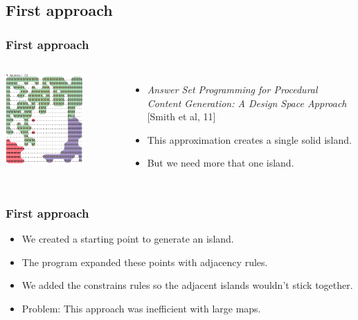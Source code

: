 \subsection{First approach}
\begin{frame}
\frametitle{First approach}

\begin{columns}
	\centering \includegraphics[width=0.7\textwidth]{images/adam.png}
	
	\begin{itemize}
		\item<1-> \textit{Answer Set Programming for Procedural Content Generation: A Design Space Approach} \textcolor{UDCpink}{[Smith et al, 11]}
		\item<2-> This approximation creates a single solid island.
		\item<3-> But we need more that one island.
	\end{itemize} 
\end{columns}
	
\end{frame}

\begin{frame}
\frametitle{First approach}

\begin{itemize}
	\item<1-> We created a starting point to generate an island.
	\item<2-> The program expanded these points with adjacency rules.
	\item<3-> We added the constrains rules so the adjacent islands wouldn't stick together.
	\item<4-> \textcolor{UDCpink}{Problem:} This approach was inefficient with large maps.
\end{itemize}

\end{frame}

